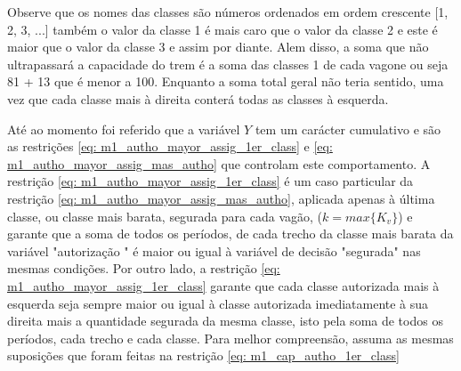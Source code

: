 Observe que os nomes das classes são números ordenados em ordem crescente [1, 2, 3, ...] também o valor da classe 1 é mais caro que o valor da classe 2 e este é maior que o valor da classe 3 e assim por diante. Alem disso, a soma que não ultrapassará a capacidade do trem é a soma das classes 1 de cada vagone ou seja 81 + 13 que é menor a 100. Enquanto a soma total geral não teria sentido, uma vez que cada classe mais à direita conterá todas as classes à esquerda.


Até ao momento foi referido que a variável $Y$ tem um carácter cumulativo e são as restrições \ref{eq: m1_autho_mayor_assig_1er_class} e \ref{eq: m1_autho_mayor_assig_mas_autho} que controlam este comportamento. A restrição \ref{eq: m1_autho_mayor_assig_1er_class} é um caso particular da restrição \ref{eq: m1_autho_mayor_assig_mas_autho}, aplicada apenas à última classe, ou classe mais barata, segurada para cada vagão, ($k=max\{K_v\}$) e garante que a soma de todos os períodos, de cada trecho da classe mais barata da variável "autorização " é maior ou igual à variável de decisão "segurada" nas mesmas condições. Por outro lado, a restrição \ref{eq: m1_autho_mayor_assig_1er_class} garante que cada classe autorizada mais à esquerda seja sempre maior ou igual à classe autorizada imediatamente à sua direita mais a quantidade segurada da mesma classe, isto pela soma de todos os períodos, cada trecho e cada classe. Para melhor compreensão, assuma as mesmas suposições que foram feitas na restrição \ref{eq: m1_cap_autho_1er_class} %


